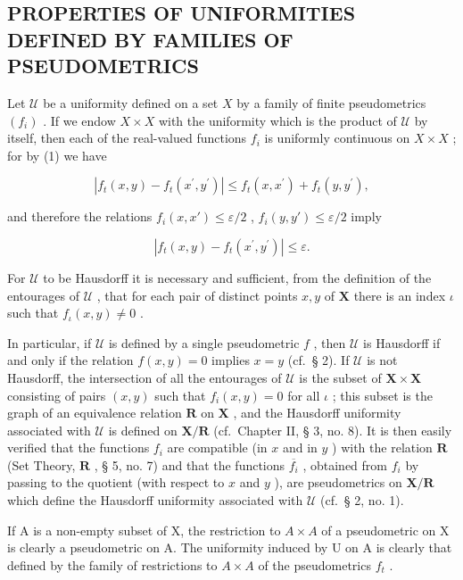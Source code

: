 \subsection{PROPERTIES OF UNIFORMITIES DEFINED BY FAMILIES OF PSEUDOMETRICS}

Let \(\mathcal{U}\) be a uniformity defined on a set \(X\) by a family of finite pseudometrics \((f_{i})\) . If we endow \(X \times X\) with the uniformity which is the product of \(\mathcal{U}\) by itself, then each of the real-valued functions \(f_{i}\) is uniformly continuous on \(X \times X\) ; for by (1) we have

\[
\left| f _ {t} (x, y) - f _ {t} \left(x ^ {\prime}, y ^ {\prime}\right) \right| \leqslant f _ {t} (x, x ^ {\prime}) + f _ {t} (y, y ^ {\prime}),
\]

and therefore the relations \(f_{i}(x, x') \leqslant \varepsilon / 2\) , \(f_{i}(y, y') \leqslant \varepsilon / 2\) imply

\[
\left| f _ {t} (x, y) - f _ {t} \left(x ^ {\prime}, y ^ {\prime}\right) \right| \leqslant \varepsilon .
\]

For \(\mathcal{U}\) to be Hausdorff it is necessary and sufficient, from the definition of the entourages of \(\mathcal{U}\) , that for each pair of distinct points \(x, y\) of \(\mathbf{X}\) there is an index \(\iota\) such that \(f_{\iota}(x, y) \neq 0\) .

In particular, if \(\mathcal{U}\) is defined by a single pseudometric \(f\) , then \(\mathcal{U}\) is Hausdorff if and only if the relation \(f(x,y)=0\) implies \(x=y\) (cf.~§ 2). If \(\mathcal{U}\) is not Hausdorff, the intersection of all the entourages of \(\mathcal{U}\) is the subset of \(\mathbf{X} \times \mathbf{X}\) consisting of pairs \((x,y)\) such that \(f_{i}(x,y)=0\) for all \(\iota\) ; this subset is the graph of an equivalence relation \(\mathbf{R}\) on \(\mathbf{X}\) , and the Hausdorff uniformity associated with \(\mathcal{U}\) is defined on \(\mathbf{X}/\mathbf{R}\) (cf.~Chapter II, § 3, no. 8). It is then easily verified that the functions \(f_{i}\) are compatible (in \(x\) and in \(y\) ) with the relation \(\mathbf{R}\) (Set Theory, \(\mathbf{R}\) , § 5, no. 7) and that the functions \(\overline{f_{i}}\) , obtained from \(f_{i}\) by passing to the quotient (with respect to \(x\) and \(y\) ), are pseudometrics on \(\mathbf{X}/\mathbf{R}\) which define the Hausdorff uniformity associated with \(\mathcal{U}\) (cf.~§ 2, no. 1).

If A is a non-empty subset of X, the restriction to \(A \times A\) of a pseudometric on X is clearly a pseudometric on A. The uniformity induced by U on A is clearly that defined by the family of restrictions to \(A \times A\) of the pseudometrics \(f_{t}\) .

